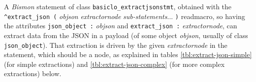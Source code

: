 A \emph{Bismon} statement of class \texttt{basiclo\_extractjsonstmt},
obtained with the \texttt{{\^{}}{extract\_json} (} \textit{objson}
\textit {extractornode} \textit{sub-statements}... \texttt{)}
readmacro, so having the attributes \texttt{json\_object :}
\textit{objson} and \texttt{extract\_json :} \textit{extractornode},
 
 can extract data from the JSON in a
payload (of some object \textit{objson}, usually of class
\texttt{json\_object}). That extraction is driven by the given
\textit{extractornode} in the statement, which should be a node, as
explained in tables \ref{tbl:extract-json-simple} (for simple
extractions) and \ref{tbl:extract-json-complex} (for more complex
extractions) below.

